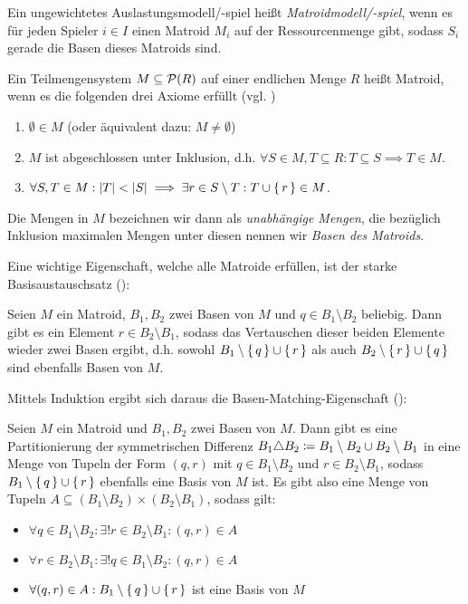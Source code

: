 \begin{defn}
	Ein ungewichtetes Auslastungsmodell/-spiel heißt \emph{Matroidmodell/-spiel}, wenn es für jeden Spieler $i \in I$ einen Matroid $M_i$ auf der Ressourcenmenge gibt, sodass $S_i$ gerade die Basen dieses Matroids sind.
\end{defn}

\begin{defn}
	Ein Teilmengensystem $M \subseteq \mathcal{P}(R)$ auf einer endlichen Menge $R$ heißt Matroid, wenn es die folgenden drei Axiome erfüllt (vgl. \cite[Abschnitt 39.1]{CombOptMatroide})
	\begin{enumerate}
		\item $\emptyset \in M$ (oder äquivalent dazu: $M \neq \emptyset$)
		\item $M$ ist abgeschlossen unter Inklusion, d.h. $\forall S \in M, T \subseteq R: T \subseteq S \implies T \in M$.
		\item $\forall S, T \in M: \left|T\right| < \left|S\right| \implies \exists r \in S \setminus T: T \cup \set{r} \in M$.
	\end{enumerate}
	Die Mengen in $M$ bezeichnen wir dann als \emph{unabhängige Mengen}, die bezüglich Inklusion maximalen Mengen unter diesen nennen wir \emph{Basen des Matroids}.
\end{defn}

Eine wichtige Eigenschaft, welche alle Matroide erfüllen, ist der starke Basisaustauschsatz (\cite[Theorem 29.12]{CombOptMatroide}):

\begin{satz}
	Seien $M$ ein Matroid, $B_1, B_2$ zwei Basen von $M$ und $q \in B_1 \setminus B_2$ beliebig. Dann gibt es ein Element $r \in B_2 \setminus B_1$, sodass das Vertauschen dieser beiden Elemente wieder zwei Basen ergibt, d.h. sowohl $B_1 \setminus \set{q} \cup \set{r}$ als auch $B_2 \setminus \set{r} \cup \set{q}$ sind ebenfalls Basen von $M$.
\end{satz}

Mittels Induktion ergibt sich daraus die Basen-Matching-Eigenschaft (\cite[Korollar 39.12a]{CombOptMatroide}):

\begin{kor}\label{kor:BasenMatchingEig}
	Seien $M$ ein Matroid und $B_1, B_2$ zwei Basen von $M$. Dann gibt es eine Partitionierung der symmetrischen Differenz $B_1 \triangle B_2 \coloneqq B_1 \setminus B_2 \cup B_2 \setminus B_1$ in eine Menge von Tupeln der Form $(q,r)$ mit $q \in B_1\setminus B_2$ und $r \in B_2 \setminus B_1$, sodass $B_1 \setminus \set{q} \cup \set{r}$ ebenfalls eine Basis von $M$ ist. Es gibt also eine Menge von Tupeln $A \subseteq (B_1 \setminus B_2) \times (B_2 \setminus B_1)$, sodass gilt:
	\begin{itemize}
		\item $\forall q \in B_1 \setminus B_2: \exists! r \in B_2 \setminus B_1: (q,r) \in A$
		\item $\forall r \in B_2 \setminus B_1: \exists! q \in B_1 \setminus B_2: (q,r) \in A$
		\item $\forall (q,r) \in A: B_1 \setminus \set{q} \cup \set{r}$ ist eine Basis von $M$
	\end{itemize}
\end{kor}
